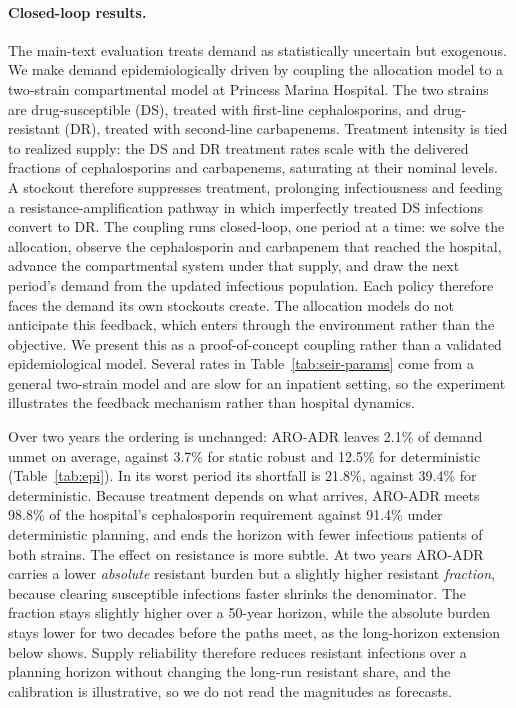 \documentclass[11pt]{article}
\begin{document}
\paragraph{Closed-loop results.}
The main-text evaluation treats demand as statistically uncertain but exogenous.
We make demand epidemiologically driven by coupling the allocation model to a two-strain compartmental model at Princess Marina Hospital.
The two strains are drug-susceptible (DS), treated with first-line cephalosporins, and drug-resistant (DR), treated with second-line carbapenems.
Treatment intensity is tied to realized supply: the DS and DR treatment rates scale with the delivered fractions of cephalosporins and carbapenems, saturating at their nominal levels.
A stockout therefore suppresses treatment, prolonging infectiousness and feeding a resistance-amplification pathway in which imperfectly treated DS infections convert to DR.
The coupling runs closed-loop, one period at a time: we solve the allocation, observe the cephalosporin and carbapenem that reached the hospital, advance the compartmental system under that supply, and draw the next period's demand from the updated infectious population.
Each policy therefore faces the demand its own stockouts create.
The allocation models do not anticipate this feedback, which enters through the environment rather than the objective.
We present this as a proof-of-concept coupling rather than a validated epidemiological model.
Several rates in Table~\ref{tab:seir-params} come from a general two-strain model and are slow for an inpatient setting, so the experiment illustrates the feedback mechanism rather than hospital dynamics.

Over two years the ordering is unchanged: ARO-ADR leaves 2.1\% of demand unmet on average, against 3.7\% for static robust and 12.5\% for deterministic (Table~\ref{tab:epi}).
In its worst period its shortfall is 21.8\%, against 39.4\% for deterministic.
Because treatment depends on what arrives, ARO-ADR meets 98.8\% of the hospital's cephalosporin requirement against 91.4\% under deterministic planning, and ends the horizon with fewer infectious patients of both strains.
The effect on resistance is more subtle.
At two years ARO-ADR carries a lower \emph{absolute} resistant burden but a slightly higher resistant \emph{fraction}, because clearing susceptible infections faster shrinks the denominator.
The fraction stays slightly higher over a 50-year horizon, while the absolute burden stays lower for two decades before the paths meet, as the long-horizon extension below shows.
Supply reliability therefore reduces resistant infections over a planning horizon without changing the long-run resistant share, and the calibration is illustrative, so we do not read the magnitudes as forecasts.
\end{document}
